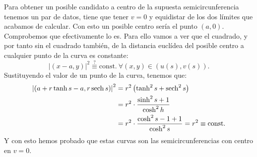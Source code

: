 Para obtener un posible candidato a centro de la supuesta semicircunferencia
tenemos un par de datos, tiene que tener $v = 0$ y equidistar de los dos límites
que acabamos de calcular. Con esto un posible centro sería el punto $\left( a, 0
\right)$. Comprobemos que efectivamente lo es. Para ello vamos a ver que el
cuadrado, y por tanto sin el cuadrado también, de la distancia euclídea del
posible centro a cualquier punto de la curva es constante:
\[
\left\lvert \left( x - a , y \right) \right\rvert^2 \stackrel{?}{\equiv}
\mathrm{const.}\ \forall \left( x, y \right) \in \left( u\left( s \right), v\left( s
\right) \right).
\]
Sustituyendo el valor de un punto de la curva, tenemos que:
\begin{align*}
    \left\lvert \left( a + r \tanh s - a, r \operatorname{sech} s \right) \right\rvert^2 &=
    r^2 \left( \tanh^2 s + \operatorname{sech}^2 s \right)\\ 
    &= r^2 \cdot \frac{\sinh^2 s + 1}{\cosh^2 h}\\
    &= r^2 \cdot \frac{\cosh^2 s - 1 + 1}{\cosh^2 s} = r^2 \equiv \mathrm{const.}
\end{align*}
Y con esto hemos probado que estas curvas son las semicircunferencias con centro
en $v = 0$.
